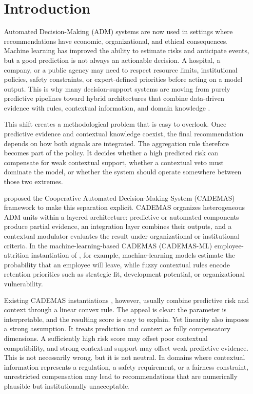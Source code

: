 \documentclass[mathematics,article,submit,moreauthors]{Definitions/mdpi}
\begin{document}
\section{Introduction}

Automated Decision-Making (ADM) systems are now used in settings where recommendations have economic, organizational, and ethical consequences. Machine learning has improved the ability to estimate risks and anticipate events, but a good prediction is not always an actionable decision. A hospital, a company, or a public agency may need to respect resource limits, institutional policies, safety constraints, or expert-defined priorities before acting on a model output. This is why many decision-support systems are moving from purely predictive pipelines toward hybrid architectures that combine data-driven evidence with rules, contextual information, and domain knowledge \citep{Kierner2023,Rahman2025,PerezDominguez2024}.

This shift creates a methodological problem that is easy to overlook. Once predictive evidence and contextual knowledge coexist, the final recommendation depends on how both signals are integrated. The aggregation rule therefore becomes part of the policy. It decides whether a high predicted risk can compensate for weak contextual support, whether a contextual veto must dominate the model, or whether the system should operate somewhere between those two extremes.

\citet{NovoaHernandez2026} proposed the Cooperative Automated Decision-Making System (CADEMAS) framework to make this separation explicit. CADEMAS organizes heterogeneous ADM units within a layered architecture: predictive or automated components produce partial evidence, an integration layer combines their outputs, and a contextual modulator evaluates the result under organizational or institutional criteria. In the machine-learning-based CADEMAS (CADEMAS-ML) employee-attrition instantiation of \citet{Godz2026}, for example, machine-learning models estimate the probability that an employee will leave, while fuzzy contextual rules encode retention priorities such as strategic fit, development potential, or organizational vulnerability.

Existing CADEMAS instantiations \citep{NovoaHernandez2026, Godz2026}, however, usually combine predictive risk and context through a linear convex rule. The appeal is clear: the parameter is interpretable, and the resulting score is easy to explain. Yet linearity also imposes a strong assumption. It treats prediction and context as fully compensatory dimensions. A sufficiently high risk score may offset poor contextual compatibility, and strong contextual support may offset weak predictive evidence. This is not necessarily wrong, but it is not neutral. In domains where contextual information represents a regulation, a safety requirement, or a fairness constraint, unrestricted compensation may lead to recommendations that are numerically plausible but institutionally unacceptable.
\end{document}
